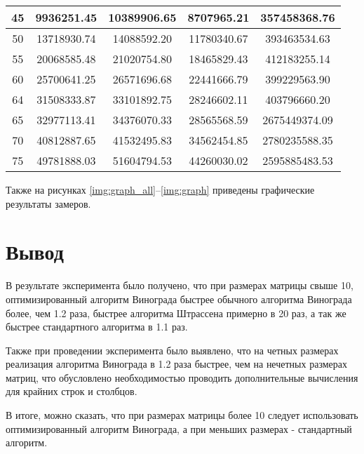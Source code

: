 \begin{table}[h]
\begin{center}
\begin{threeparttable}
\begin{tabular}{|c|c|c|c|c|}
            \hline
            45 & 9936251.45 & 10389906.65 & 8707965.21 & 357458368.76 \\ 
            \hline
            50 & 13718930.74 & 14088592.20 & 11780340.67 & 393463534.63 \\ 
            \hline
            55 & 20068585.48 & 21020754.80 & 18465829.43 & 412183255.14 \\ 
            \hline
            60 & 25700641.25 & 26571696.68 & 22441666.79 & 399229563.90 \\ 
            \hline
            64 & 31508333.87 & 33101892.75 & 28246602.11 & 403796660.20 \\ 
            \hline
            65 & 32977113.41 & 34376070.33 & 28565568.59 & 2675449374.09 \\ 
            \hline
            70 & 40812887.65 & 41532495.83 & 34562454.85 & 2780235588.35 \\ 
            \hline
            75 & 49781888.03 & 51604794.53 & 44260030.02 & 2595885483.53 \\ 
            \hline
		\end{tabular}
    \end{threeparttable}
\end{center}
\end{table}

\clearpage
Также на рисунках \ref{img:graph_all}--\ref{img:graph} приведены графические результаты замеров.

\clearpage


\section{Вывод}

В результате эксперимента было получено, что при размерах матрицы свыше 10, оптимизированный алгоритм Винограда быстрее обычного алгоритма Винограда более, чем 1.2 раза, быстрее алгоритма Штрассена примерно в 20 раз, а так же быстрее стандартного алгоритма в 1.1 раз. 

Также при проведении эксперимента было выявлено, что на четных размерах реализация алгоритма Винограда в 1.2 раза быстрее, чем на нечетных размерах матриц, что обусловлено необходимостью проводить дополнительные вычисления для крайних строк и столбцов.  

В итоге, можно сказать, что при размерах матрицы более 10 следует использовать оптимизированный алгоритм Винограда, а при меньших размерах - стандартный алгоритм.